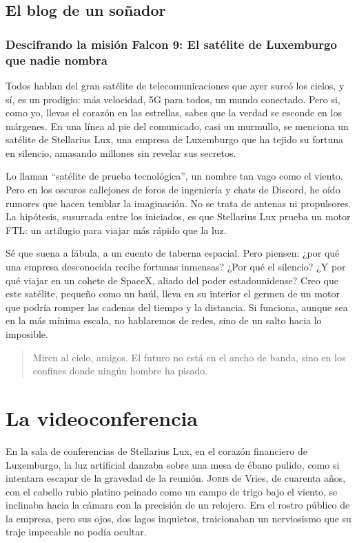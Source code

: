 \section{El blog de un soñador}

\subsection*{Descifrando la misión Falcon 9: El satélite de Luxemburgo que nadie nombra}

Todos hablan del gran satélite de telecomunicaciones que ayer surcó los cielos, y sí, es un prodigio: más velocidad, 5G para todos, un mundo conectado. Pero si, como yo, llevas el corazón en las estrellas, sabes que la verdad se esconde en los márgenes. En una línea al pie del comunicado, casi un murmullo, se menciona un satélite de Stellarius Lux, una empresa de Luxemburgo que ha tejido su fortuna en silencio, amasando millones sin revelar sus secretos.

Lo llaman ``satélite de prueba tecnológica'', un nombre tan vago como el viento. Pero en los oscuros callejones de foros de ingeniería y chats de Discord, he oído rumores que hacen temblar la imaginación. No se trata de antenas ni propulsores. La hipótesis, susurrada entre los iniciados, es que Stellarius Lux prueba un motor FTL: un artilugio para viajar más rápido que la luz.

Sé que suena a fábula, a un cuento de taberna espacial. Pero piensen: ¿por qué una empresa desconocida recibe fortunas inmensas? ¿Por qué el silencio? ¿Y por qué viajar en un cohete de SpaceX, aliado del poder estadounidense? Creo que este satélite, pequeño como un baúl, lleva en su interior el germen de un motor que podría romper las cadenas del tiempo y la distancia. Si funciona, aunque sea en la más mínima escala, no hablaremos de redes, sino de un salto hacia lo imposible.

\begin{quote}
\calli
Miren al cielo, amigos. El futuro no está en el ancho de banda, sino en los confines donde ningún hombre ha pisado.
\end{quote}

\chapter{La videoconferencia}

En la sala de conferencias de Stellarius Lux, en el corazón financiero de Luxemburgo, la luz artificial danzaba sobre una mesa de ébano pulido, como si intentara escapar de la gravedad de la reunión. \lettrine[lines=2, loversize=0.3, lraise=0]{J}{oris} de Vries, de cuarenta años, con el cabello rubio platino peinado como un campo de trigo bajo el viento, se inclinaba hacia la cámara con la precisión de un relojero. Era el rostro público de la empresa, pero sus ojos, dos lagos inquietos, traicionaban un nerviosismo que su traje impecable no podía ocultar.

